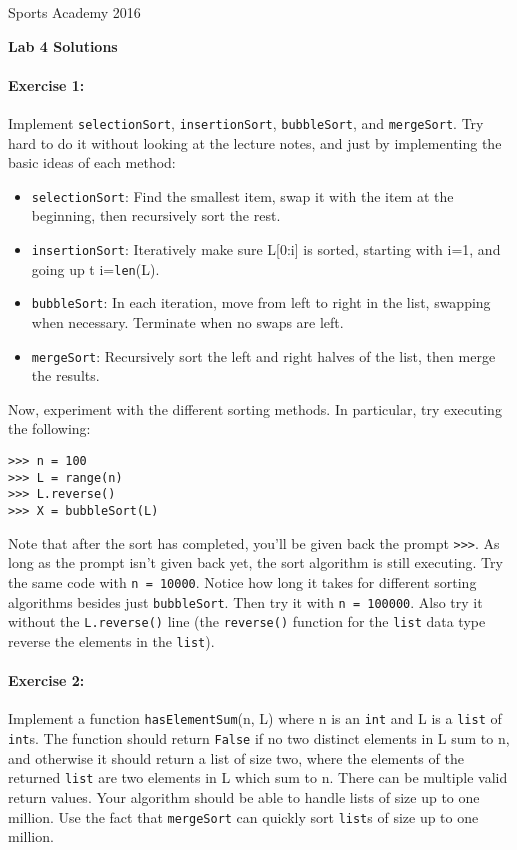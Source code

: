 \documentclass[11pt]{article}
\newlength{\toppush}
\newcommand{\htitle}[2]{\noindent\vspace*{-\toppush}\newline\parbox{6.5in}
 {\large Sports Academy \hfill #1\newline
\hspace*{\fill}{\bf Algorithms and Programming for High Schoolers} \hspace*{\fill} \newline
\mbox{}\hrulefill\mbox{}}\vspace*{1ex}\mbox{}\newline
\begin{center}{\Large\bf #2}\end{center}}
\begin{document}
\htitle{2016}{Lab 4 Solutions}

\paragraph{Exercise 1:}
Implement \texttt{selectionSort}, \texttt{insertionSort},
\texttt{bubbleSort}, and \texttt{mergeSort}.  Try hard to do it
without looking at the lecture notes, and just by implementing the
basic ideas of each method:

\begin{itemize}
\item \texttt{selectionSort}: Find the smallest item, swap it with the
  item at the beginning, then recursively sort the rest.
\item \texttt{insertionSort}: Iteratively make sure L[0:i] is sorted,
  starting with i=1, and going up t i=\texttt{len}(L).
\item \texttt{bubbleSort}: In each iteration, move from left to right
  in the list, swapping when necessary.  Terminate when no swaps are
  left.
\item \texttt{mergeSort}: Recursively sort the left and right halves
  of the list, then merge the results.
\end{itemize}

Now, experiment with the different sorting methods.  In particular,
try executing the following:

\begin{verbatim}
>>> n = 100
>>> L = range(n)
>>> L.reverse()
>>> X = bubbleSort(L)
\end{verbatim}

Note that after the sort has completed, you'll be given back the
prompt \texttt{>>>}.  As long as the prompt isn't given back yet, the
sort algorithm is still executing. Try the same code with \texttt{n =
  10000}. Notice how long it takes for different sorting algorithms
besides just \texttt{bubbleSort}.  Then try it with \texttt{n =
  100000}.  Also try it without the \texttt{L.reverse()} line (the
\texttt{reverse()} function for the \texttt{list} data type reverse
the elements in the \texttt{list}).

\paragraph{Exercise 2:}
Implement a function \texttt{hasElementSum}(n, L) where n is an
\texttt{int} and L is a \texttt{list} of \texttt{int}s.
The function should return \texttt{False} if no two distinct elements
in L sum to n, and otherwise it should return a list of size two,
where the elements of the returned \texttt{list} are two elements in L
which sum to n.  There can be multiple valid return values.
Your algorithm should be able to handle lists of
size up to one million.  Use the fact that \texttt{mergeSort} can
quickly sort \texttt{list}s of size up to one million.
\end{document}
